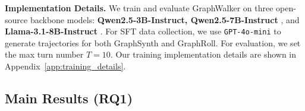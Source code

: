 \textbf{Implementation Details.}
We train and evaluate GraphWalker on three open-source backbone models: \textbf{Qwen2.5-3B-Instruct, Qwen2.5-7B-Instruct} \citep{qwen2025qwen25technicalreport}, and \textbf{Llama-3.1-8B-Instruct} \citep{dubey2024llama}.  
For SFT data collection, we use \texttt{GPT-4o-mini} to generate trajectories for both GraphSynth and GraphRoll. For evaluation, we set the max turn number $T = 10$.
Our training implementation details are shown in Appendix~\ref{app:training_details}.


\subsection{Main Results (RQ1)}

